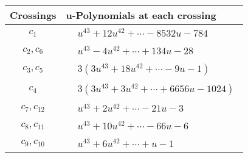 \documentclass[1p]{elsarticle_modified}
\theoremstyle{definition}
\begin{document}
\begin{tabular}{m{50pt}|m{274pt}}
Crossings & \hspace{64pt}u-Polynomials at each crossing \\
\hline $$\begin{aligned}c_{1}\end{aligned}$$&$\begin{aligned}
&u^{43}+12 u^{42}+\cdots-8532 u-784
\end{aligned}$\\
\hline $$\begin{aligned}c_{2},c_{6}\end{aligned}$$&$\begin{aligned}
&u^{43}-4 u^{42}+\cdots+134 u-28
\end{aligned}$\\
\hline $$\begin{aligned}c_{3},c_{5}\end{aligned}$$&$\begin{aligned}
&3(3 u^{43}+18 u^{42}+\cdots-9 u-1)
\end{aligned}$\\
\hline $$\begin{aligned}c_{4}\end{aligned}$$&$\begin{aligned}
&3(3 u^{43}+3 u^{42}+\cdots+6656 u-1024)
\end{aligned}$\\
\hline $$\begin{aligned}c_{7},c_{12}\end{aligned}$$&$\begin{aligned}
&u^{43}+2 u^{42}+\cdots-21 u-3
\end{aligned}$\\
\hline $$\begin{aligned}c_{8},c_{11}\end{aligned}$$&$\begin{aligned}
&u^{43}+10 u^{42}+\cdots-66 u-6
\end{aligned}$\\
\hline $$\begin{aligned}c_{9},c_{10}\end{aligned}$$&$\begin{aligned}
&u^{43}+6 u^{42}+\cdots+u-1
\end{aligned}$\\
\hline
\end{tabular}\\~\\
\newpage\renewcommand{\arraystretch}{1}
\end{document}
